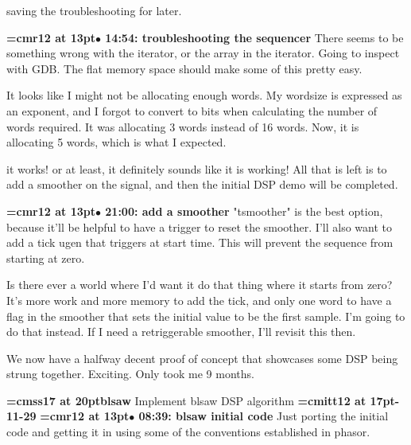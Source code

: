 saving the troubleshooting for later.
\par

{\smallskip\noindent\bf\font\titlefont=cmr12 at 13pt\titlefont $\bullet$ 14:54: troubleshooting the sequencer}\smallskip
There seems to be something wrong with the iterator, or the array in the iterator. Going to inspect with GDB. The flat memory space should make some of this pretty easy.
\par

It looks like I might not be allocating enough words. My wordsize is expressed as an exponent, and I forgot to convert to bits when calculating the number of words required. It was allocating 3 words instead of 16 words. Now, it is allocating 5 words, which is what I expected.
\par

it works! or at least, it definitely sounds like it is working! All that is left is to add a smoother on the signal, and then the initial DSP demo will be completed.
\par

{\smallskip\noindent\bf\font\titlefont=cmr12 at 13pt\titlefont $\bullet$ 21:00: add a smoother}\smallskip
"tsmoother" is the best option, because it'll be helpful to have a trigger to reset the smoother. I'll also want to add a tick ugen that triggers at start time. This will prevent the sequence from starting at zero.
\par

Is there ever a world where I'd want it do that thing where it starts from zero? It's more work and more memory to add the tick, and only one word to have a flag in the smoother that sets the initial value to be the first sample. I'm going to do that instead. If I need a retriggerable smoother, I'll revisit this then.
\par

We now have a halfway decent proof of concept that showcases some DSP being strung together. Exciting. Only took me 9 months.
\par

{\medskip\noindent\bf\font\titlefont=cmss17 at 20pt\titlefont blsaw}\medskip
Implement blsaw DSP algorithm
{\medskip\noindent\bf\font\titlefont=cmitt12 at 17pt-11-29}\medskip
{\smallskip\noindent\bf\font\titlefont=cmr12 at 13pt\titlefont $\bullet$ 08:39: blsaw initial code}\smallskip
Just porting the initial code and getting it in using some of the conventions established in phasor.
\par

